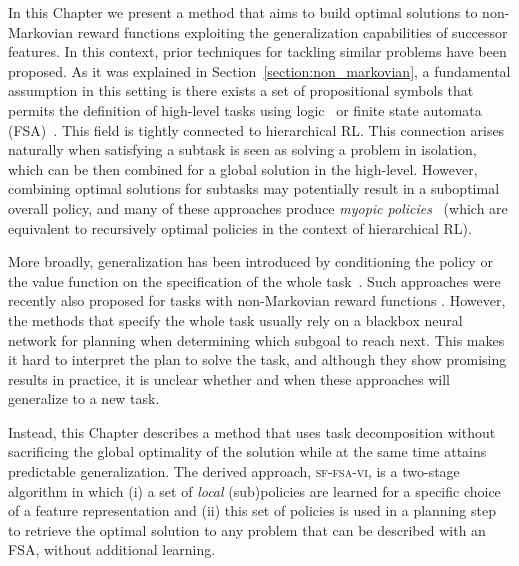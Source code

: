 In this Chapter we present a method that aims to build optimal solutions to non-Markovian reward functions exploiting the generalization capabilities of successor features. In this context, prior techniques for tackling similar problems have been proposed. As it was explained in Section~\ref{section:non_markovian}, a fundamental assumption in this setting is there exists a set of propositional symbols that permits the definition of high-level tasks using logic~\citep{ToroIcarte2019, Vaezipoor2021} or finite state automata (FSA)~\citep{Icarte2022}. This field is tightly connected to hierarchical RL. This connection arises naturally when satisfying a subtask is seen as solving a problem in isolation, which can be then combined for a global solution in the high-level. However, combining optimal solutions for subtasks may potentially result in a suboptimal overall policy, and many of these approaches produce \textit{myopic policies}~\citep{Vaezipoor2021} (which are equivalent to recursively optimal policies in the context of hierarchical RL).

More broadly, generalization has been introduced by conditioning the policy or the value function on the specification of the whole task~\citep{Schaul2015}. Such approaches were recently also proposed for tasks with non-Markovian reward functions \citep{Vaezipoor2021}. However, the methods that specify the whole task usually rely on a blackbox neural network for planning when determining which subgoal to reach next. This makes it hard to interpret the plan to solve the task, and although they show promising results in practice, %
it is unclear whether and when these approaches will generalize to a new task. 

Instead, this Chapter describes a method that uses task decomposition without sacrificing the global optimality of the solution while at the same time attains predictable generalization. The derived approach, \textsc{sf-fsa-vi}, is a two-stage algorithm in which (i) a set of \textit{local} (sub)policies are learned for a specific choice of a feature representation and (ii) this set of policies is used in a planning step to retrieve the optimal solution to any problem that can be described with an FSA, without additional learning.

